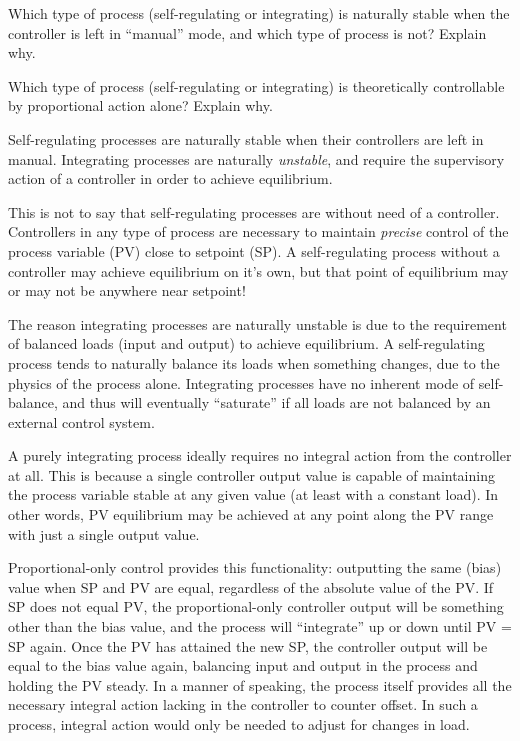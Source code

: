 

Which type of process (self-regulating or integrating) is naturally stable when the controller is left in ``manual'' mode, and which type of process is not?  Explain why.

\vskip 10pt

Which type of process (self-regulating or integrating) is theoretically controllable by proportional action alone?  Explain why.







Self-regulating processes are naturally stable when their controllers are left in manual.  Integrating processes are naturally {\it unstable}, and require the supervisory action of a controller in order to achieve equilibrium.

This is not to say that self-regulating processes are without need of a controller.  Controllers in any type of process are necessary to maintain {\it precise} control of the process variable (PV) close to setpoint (SP).  A self-regulating process without a controller may achieve equilibrium on it's own, but that point of equilibrium may or may not be anywhere near setpoint!

The reason integrating processes are naturally unstable is due to the requirement of balanced loads (input and output) to achieve equilibrium.  A self-regulating process tends to naturally balance its loads when something changes, due to the physics of the process alone.  Integrating processes have no inherent mode of self-balance, and thus will eventually ``saturate'' if all loads are not balanced by an external control system.
 
\vskip 10pt

A purely integrating process ideally requires no integral action from the controller at all.  This is because a single controller output value is capable of maintaining the process variable stable at any given value (at least with a constant load).  In other words, PV equilibrium may be achieved at any point along the PV range with just a single output value.  

Proportional-only control provides this functionality: outputting the same (bias) value when SP and PV are equal, regardless of the absolute value of the PV.  If SP does not equal PV, the proportional-only controller output will be something other than the bias value, and the process will ``integrate'' up or down until PV = SP again.  Once the PV has attained the new SP, the controller output will be equal to the bias value again, balancing input and output in the process and holding the PV steady.  In a manner of speaking, the process itself provides all the necessary integral action lacking in the controller to counter offset.  In such a process, integral action would only be needed to adjust for changes in load.

